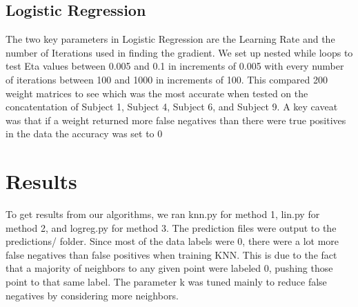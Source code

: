 \documentclass[11pt,a4paper]{article}
\begin{document}
\subsection{Logistic Regression}
The two key parameters in Logistic Regression are the Learning Rate and the number of Iterations used in finding the gradient. We set up nested while loops to test Eta values between 0.005 and 0.1 in increments of 0.005 with every number of iterations between 100 and 1000 in increments of 100. This compared 200 weight matrices to see which was the most accurate when tested on the concatentation of Subject 1, Subject 4, Subject 6, and Subject 9. A key caveat was that if a weight returned more false negatives than there were true positives in the data the accuracy was set to 0%

\section{Results}
To get results from our algorithms, we ran knn.py for method 1, lin.py for method 2, and logreg.py for method 3. The prediction files were output to the predictions/ folder. Since most of the data labels were 0, there were a lot more false negatives than false positives when training KNN. This is due to the fact that a majority of neighbors to any given point were labeled 0, pushing those point to that same label. The parameter k was tuned mainly to reduce false negatives by considering more neighbors.
\end{document}
